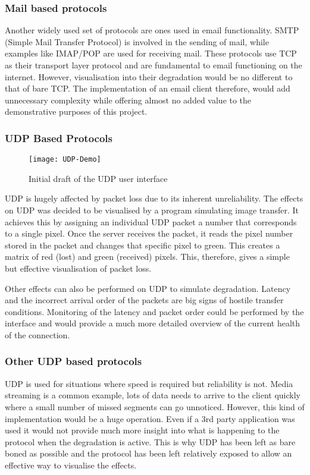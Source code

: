 \subsubsection*{Mail based protocols}
Another widely used set of protocols are ones used in email functionality. SMTP (Simple Mail Transfer Protocol) is involved in the sending of mail, while examples like IMAP/POP are used for receiving mail. These protocols use TCP as their transport layer protocol and are fundamental to email functioning on the internet. However, visualisation into their degradation would be no different to that of bare TCP. The implementation of an email client therefore, would add unnecessary complexity while offering almost no added value to the demonstrative purposes of this project.


\subsubsection{UDP Based Protocols}
\begin{wrapfigure}{R}{5cm}
\begin{center}
	\texttt{[image: UDP-Demo]}
	\caption{Initial draft of the UDP user interface}
\end{center}
\end{wrapfigure}

UDP is hugely affected by packet loss due to its inherent unreliability. The effects on UDP was decided to be visualised by a program simulating image transfer. It achieves this by assigning an individual UDP packet a number that corresponds to a single pixel. Once the server receives the packet, it reads the pixel number stored in the packet and changes that specific pixel to green. This creates a matrix of red (lost) and green (received) pixels. This, therefore, gives a simple but effective visualisation of packet loss. 

Other effects can also be performed on UDP to simulate degradation. Latency and the incorrect arrival order of the packets are big signs of hostile transfer conditions. Monitoring of the latency and packet order could be performed by the interface and would provide a much more detailed overview of the current health of the connection.

\subsubsection*{Other UDP based protocols}
UDP is used for situations where speed is required but reliability is not. Media streaming is a common example, lots of data needs to arrive to the client quickly where a small number of missed segments can go unnoticed. However, this kind of implementation would be a huge operation. Even if a 3rd party application was used it would not provide much more insight into what is happening to the protocol when the degradation is active. This is why UDP has been left as bare boned as possible and the protocol has been left relatively exposed to allow an effective way to visualise the effects.

